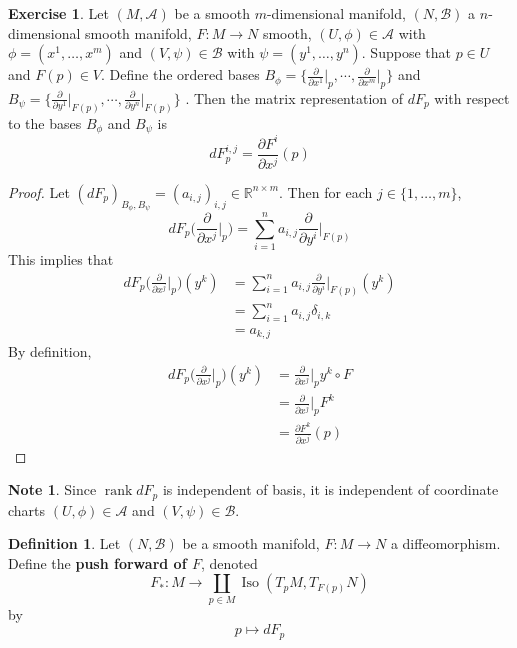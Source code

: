 \documentclass{book}
\theoremstyle{definition}
\newtheorem{defn}[definition]{Definition}
\newtheorem{note}[definition]{Note}
\newtheorem{ex}[definition]{Exercise}
\newcommand{\del}{\delta}
\newcommand{\R}{\mathbb{R}}
\newcommand{\MA}{\mathcal{A}}
\newcommand{\MB}{\mathcal{B}}
\DeclareMathOperator{\iso}{Iso}
\DeclareMathOperator{\rnk}{rank}
\DeclareMathOperator*{\0}{\mbf{0}}
\DeclareMathOperator*{\1}{\mbf{1}}
\newcommand{\tbf}[1]{\textbf{#1}}
\newcommand{\p}{\partial}
\begin{document}
	\begin{ex}
		Let $(M, \MA)$ be a smooth $m$-dimensional manifold, $(N, \MB)$ a $n$-dimensional smooth manifold, $F: M \rightarrow N$ smooth, $(U, \phi) \in \MA$ with $\phi = (x^1, \dots, x^m)$ and $(V, \psi) \in \MB$ with $\psi = (y^1, \dots, y^n)$. Suppose that $p \in U$ and $F(p) \in V$. Define the ordered bases $B_\phi = \bigg \{\frac{\p}{\p x^1} \bigg|_p, \cdots, \frac{\p}{\p x^m} \bigg|_p \bigg \}$ and $B_{\psi} = \bigg \{\frac{\p}{\p y^1} \bigg|_{F(p)}, \cdots, \frac{\p}{\p y^n} \bigg|_{F(p)} \bigg \}$ .
		Then the matrix representation of $dF_p$ with respect to the bases
		$B_{\phi}$ and $B_{\psi}$ is $$ dF_p^{i,j} =  \frac{\p F^i}{\p x^j}(p)$$
	\end{ex}

	\begin{proof}
		Let $(dF_p)_{B_\phi, B_{\psi}} = (a_{i,j})_{i,j} \in \R^{n \times m}$. Then for each $j \in \{1, \dots, m\}$, $$dF_p \bigg(\frac{\p }{\p x^j} \bigg|_p\bigg) = \sum_{i=1}^n a_{i,j}\frac{\p }{\p y^i} \bigg|_{F(p)}$$
		This implies that 
		\begin{align*}
			dF_p \bigg(\frac{\p }{\p x^j} \bigg|_p\bigg) (y^k )
			&=   \sum_{i=1}^n a_{i,j}\frac{\p }{\p y^i} \bigg|_{F(p)} (y^k) \\
			&= \sum_{i=1}^n a_{i,j} \del_{i,k} \\
			&= a_{k, j}
		\end{align*}
		By definition, 
		\begin{align*}
			dF_p \bigg(\frac{\p }{\p x^j} \bigg|_p\bigg) (y^k )
			&=  \frac{\p }{\p x^j} \bigg|_p y^k \circ F \\
			&= \frac{\p }{\p x^j} \bigg|_p F^k \\
			&= \frac{\p F^k}{\p x^j} (p)
		\end{align*}
	\end{proof}
	
	
	\begin{note}
	Since $\rnk dF_p$ is independent of basis, it is independent of coordinate charts $(U, \phi) \in \MA$ and $(V, \psi) \in \MB$. 
	\end{note}	
	
	
	
	

	\newpage

	\begin{defn}
		Let $(N, \MB)$ be a smooth manifold, $F: M \rightarrow N$ a diffeomorphism. Define the \tbf{push forward of $F$}, denoted $$F_*:M \rightarrow \coprod_{p \in M} \iso(T_pM, T_{F(p)}N)$$ by $$p \mapsto dF_p$$
	\end{defn}
	
\end{document}
